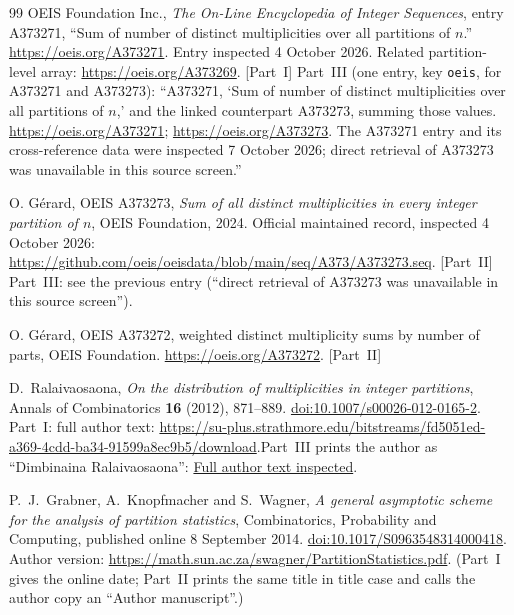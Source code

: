 \documentclass[11pt,letterpaper]{article}
\numberwithin{equation}{section}
\theoremstyle{definition}\newtheorem{definition}[theorem]{Definition}
\theoremstyle{remark}\newtheorem{remark}[theorem]{Remark}
\newcommand{\file}[1]{\nolinkurl{#1}}
\begin{document}
\begin{thebibliography}{99}
OEIS Foundation Inc., \emph{The On-Line Encyclopedia of Integer Sequences}, entry A373271, ``Sum of number of distinct multiplicities over all partitions of $n$.''
\url{https://oeis.org/A373271}. Entry inspected 4 October 2026. Related partition-level array: \url{https://oeis.org/A373269}. [Part~I] Part~III (one entry, key \file{oeis}, for A373271 and A373273): ``A373271, `Sum of number of distinct multiplicities over all partitions of $n$,' and the linked counterpart A373273, summing those values. \url{https://oeis.org/A373271}; \url{https://oeis.org/A373273}. The A373271 entry and its cross-reference data were inspected 7 October 2026; direct retrieval of A373273 was unavailable in this source screen.''

O. G\'erard, OEIS A373273, \emph{Sum of all distinct multiplicities in every integer partition of $n$}, OEIS Foundation, 2024. Official maintained record, inspected 4 October 2026:\\
\url{https://github.com/oeis/oeisdata/blob/main/seq/A373/A373273.seq}. [Part~II] Part~III: see the previous entry (``direct retrieval of A373273 was unavailable in this source screen'').

O. G\'erard, OEIS A373272, weighted distinct multiplicity sums by number of parts, OEIS Foundation. \url{https://oeis.org/A373272}. [Part~II]

D.~Ralaivaosaona, \emph{On the distribution of multiplicities in integer partitions}, Annals of Combinatorics \textbf{16} (2012), 871--889.
\href{https://doi.org/10.1007/s00026-012-0165-2}{doi:10.1007/s00026-012-0165-2}.
Part~I: full author text: \url{https://su-plus.strathmore.edu/bitstreams/fd5051ed-a369-4cdd-ba34-91599a8ec9b5/download}.\newline Part~III prints the author as ``Dimbinaina Ralaivaosaona'': \href{https://su-plus.strathmore.edu/server/api/core/bitstreams/fd5051ed-a369-4cdd-ba34-91599a8ec9b5/content}{Full author text inspected}.

P.~J.~Grabner, A.~Knopfmacher and S.~Wagner,
\emph{A general asymptotic scheme for the analysis of partition statistics}, Combinatorics, Probability and Computing, published online 8 September 2014.
\href{https://doi.org/10.1017/S0963548314000418}{doi:10.1017/S0963548314000418}.
Author version: \url{https://math.sun.ac.za/swagner/PartitionStatistics.pdf}. (Part~I gives the online date; Part~II prints the same title in title case and calls the author copy an ``Author manuscript''.)


\end{thebibliography}
\end{document}
